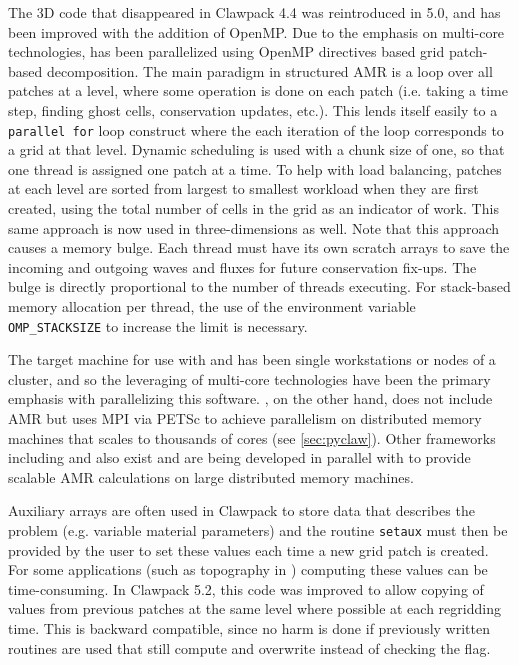The 3D \amrclaw code that disappeared in Clawpack 4.4 was reintroduced in
5.0, and has been improved with the addition of OpenMP.
Due to the emphasis on multi-core technologies, \amrclaw has been parallelized
using OpenMP directives based grid patch-based decomposition.  
The main paradigm in structured AMR is a loop over
all patches at a level, where some operation is done on each patch
(i.e. taking a time step, finding ghost cells, conservation
updates, etc.). This lends itself easily to a {\tt parallel for} loop
construct where the each iteration of the loop corresponds to a
grid at that level. Dynamic scheduling is used with a chunk size
of one, so that one thread is assigned one patch at a time. 
To help with load balancing, patches at
each level are sorted from largest to smallest workload when they
are first created, using
the total number of cells in the grid as an indicator of work.
This same approach is now used in three-dimensions as well. 
Note that this approach causes a memory bulge. Each thread
must have its own scratch arrays to save the incoming and
outgoing waves and fluxes for future conservation fix-ups. 
The bulge is directly proportional to the number
of threads executing. For stack-based memory allocation per
thread, the use of the environment variable 
{\tt OMP\_STACKSIZE} to increase the limit is necessary.


The target machine for use with \amrclaw and \geoclaw
has been single workstations or nodes of a cluster, and so
the leveraging of multi-core technologies have been the primary
emphasis with parallelizing this software.  
\pyclaw, on the other hand, does not include AMR but uses MPI via
PETSc to achieve parallelism on distributed memory machines that scales to
thousands of cores (see \cref{sec:pyclaw}).
Other frameworks including
\forestclaw \cite{Burstedde:we} and \boxlib {} also
exist and are being developed in parallel with \amrclaw to provide scalable
AMR calculations on large distributed memory machines.



Auxiliary arrays are often used in Clawpack to store data that 
describes the problem (e.g.  variable material parameters) and the routine
\texttt{setaux} must then be provided by the user to set these values each time a
new grid patch is created.  For some applications (such as topography in
\geoclaw) computing these values can be time-consuming.  In Clawpack 5.2,
this code was improved to allow copying of values from previous patches at
the same level where possible at each regridding time. 
This is backward compatible, since no harm is done if previously
written routines are used that still compute and overwrite instead of
checking the flag.  

